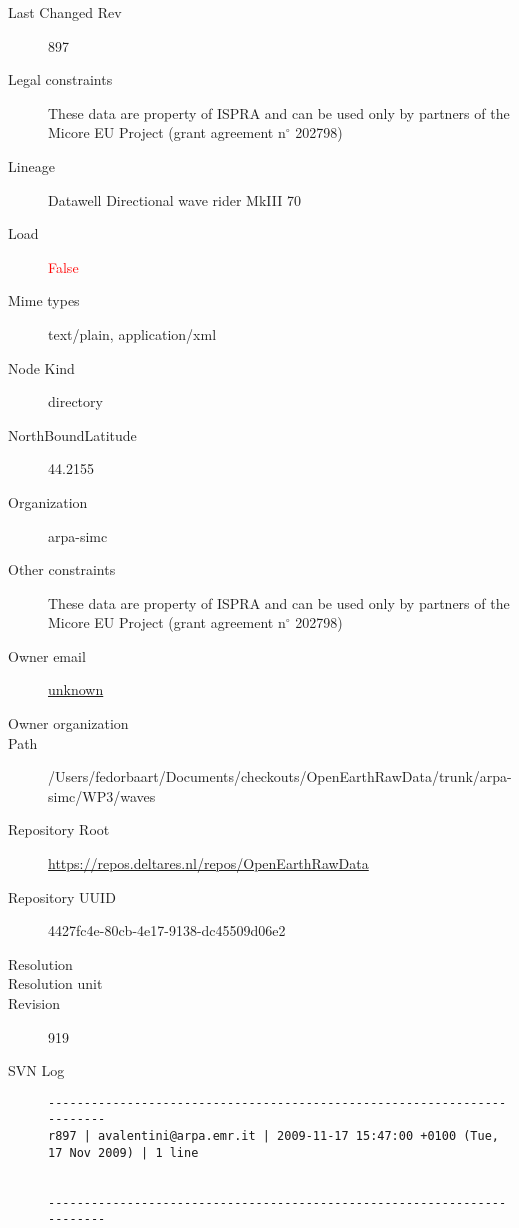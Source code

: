 \documentclass[9]{report}
\begin{document}
\begin{description}
  \item[Last Changed Rev] 897
  \item[Legal constraints] These data are property of ISPRA and can be used only by partners of the Micore EU Project (grant agreement n\mbox{$^\circ$} 202798)
  \item[Lineage] Datawell Directional wave rider MkIII 70
  \item[Load] \textcolor{red}{False}
  \item[Mime types] text/plain, application/xml
  \item[Node Kind] directory
  \item[NorthBoundLatitude] 44.2155
  \item[Organization] arpa-simc
  \item[Other constraints] These data are property of ISPRA and can be used only by partners of the Micore EU Project (grant agreement n\mbox{$^\circ$} 202798)
  \item[Owner email] \href{mailto:unknown}{unknown}
  \item[Owner organization] 
  \item[Path] /Users/fedorbaart/Documents/checkouts/OpenEarthRawData/trunk/arpa-simc/WP3/waves
  \item[Repository Root] \href{https://repos.deltares.nl/repos/OpenEarthRawData}{https://repos.deltares.nl/repos/OpenEarthRawData}
  \item[Repository UUID] 4427fc4e-80cb-4e17-9138-dc45509d06e2
  \item[Resolution] 
  \item[Resolution unit] 
  \item[Revision] 919
  \item[SVN Log] \begin{verbatim}
------------------------------------------------------------------------
r897 | avalentini@arpa.emr.it | 2009-11-17 15:47:00 +0100 (Tue, 17 Nov 2009) | 1 line


------------------------------------------------------------------------


\end{verbatim}
\end{description}
\end{document}

